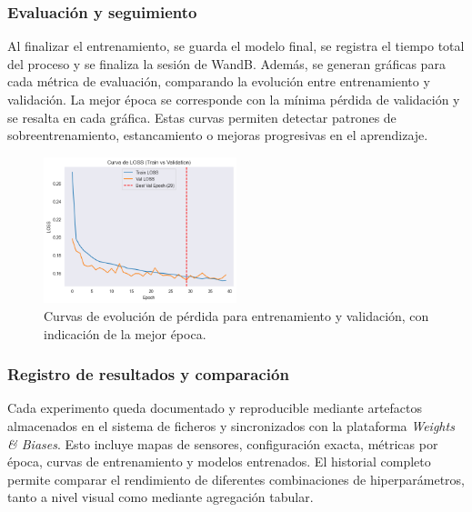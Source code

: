 \subsubsection*{Evaluación y seguimiento}  
Al finalizar el entrenamiento, se guarda el modelo final, se registra el tiempo total del proceso y se finaliza la sesión de WandB. Además, se generan gráficas para cada métrica de evaluación, comparando la evolución entre entrenamiento y validación. La mejor época se corresponde con la mínima pérdida de validación y se resalta en cada gráfica. Estas curvas permiten detectar patrones de sobreentrenamiento, estancamiento o mejoras progresivas en el aprendizaje.

\begin{figure}[H]
	\centering
	\includegraphics[width=0.5\textwidth]{includes/cap5/loss_curve_example.png}
	\caption{Curvas de evolución de pérdida para entrenamiento y validación, con indicación de la mejor época.}
	\label{fig:loss_curve_example}
\end{figure}

\subsubsection*{Registro de resultados y comparación}  
Cada experimento queda documentado y reproducible mediante artefactos almacenados en el sistema de ficheros y sincronizados con la plataforma \textit{Weights \& Biases}. Esto incluye mapas de sensores, configuración exacta, métricas por época, curvas de entrenamiento y modelos entrenados. El historial completo permite comparar el rendimiento de diferentes combinaciones de hiperparámetros, tanto a nivel visual como mediante agregación tabular.
